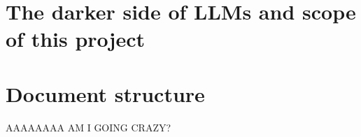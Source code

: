 \section{The darker side of LLMs and scope of this project}

\section{Document structure}
AAAAAAAA AM I GOING CRAZY?